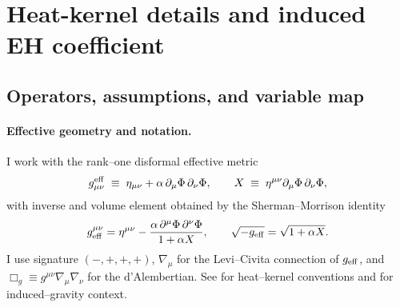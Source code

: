 \documentclass{iopjournal}
\begin{document}













\clearpage
\appendix
\renewcommand\thesection{\Alph{section}}
\renewcommand\thesubsection{\thesection.\arabic{subsection}}





\section{Heat-kernel details and induced EH coefficient}
\label{app:A}

\subsection{Operators, assumptions, and variable map}\label{app:A1}

\paragraph{Effective geometry and notation.}
I work with the rank–one disformal effective metric
\begin{equation}
g^{\rm eff}_{\mu\nu}\;\equiv\;\eta_{\mu\nu}+\alpha\,\partial_\mu\Phi\,\partial_\nu\Phi,
\qquad
X\;\equiv\;\eta^{\mu\nu}\partial_\mu\Phi\,\partial_\nu\Phi,
\label{eq:disformal_metric}
\end{equation}
with inverse and volume element obtained by the Sherman–Morrison identity
\begin{equation}
g_{\rm eff}^{\mu\nu}=\eta^{\mu\nu}-\frac{\alpha\,\partial^\mu\Phi\,\partial^\nu\Phi}{1+\alpha X},
\qquad
\sqrt{-g_{\rm eff}}=\sqrt{1+\alpha X}.
\label{eq:inverse_det}
\end{equation}
I use signature $(-,+,+,+)$, $\nabla_\mu$ for the Levi–Civita connection of $g_{\rm eff}$, and $\Box_{g}\equiv g^{\mu\nu}\nabla_\mu\nabla_\nu$ for the d’Alembertian. See \cite{DeWitt1965,BirrellDavies,ParkerToms,Avramidi2000,Vassilevich2003} for heat–kernel conventions and \cite{Sakharov1967,Donoghue1994} for induced–gravity context. 
\end{document}
